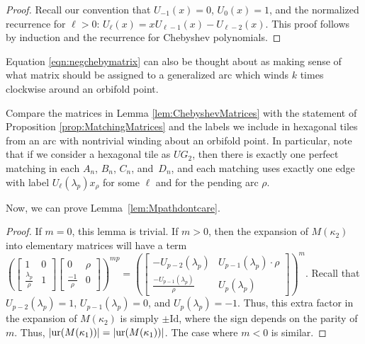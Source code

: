 \documentclass[pdftex]{sigma}%
\numberwithin{equation}{section}
\begin{document}
\begin{proof}Recall our convention that $U_{-1}(x) = 0$, $U_0(x) = 1$, and the normalized recurrence for $\ell > 0$: $U_\ell(x) = x U_{\ell-1}(x) - U_{\ell-2}(x)$. This proof follows by induction and the recurrence for Chebyshev polynomials.
\end{proof}

\begin{Remark}Equation \ref{eqn:negchebymatrix} can also be thought about as making sense of what matrix should be assigned to a generalized arc which winds $k$ times clockwise around an orbifold point.
\end{Remark}

\begin{Remark}Compare the matrices in Lemma \ref{lem:ChebyshevMatrices} with the statement of Proposition \ref{prop:MatchingMatrices} and the labels we include in hexagonal tiles from an arc with nontrivial winding about an orbifold point. In particular, note that if we consider a hexagonal tile as $UG_2$, then there is exactly one perfect matching in each $A_n$, $B_n$, $C_n$, and~$D_n$, and each matching uses exactly one edge with label $U_\ell(\lambda_p)x_\rho$ for some $\ell$ and for the pending arc $\rho$.
\end{Remark}

Now, we can prove Lemma~\ref{lem:Mpathdontcare}.

\begin{proof}If $m = 0$, this lemma is trivial. If $m > 0$, then the expansion of $M(\kappa_2)$ into elementary matrices will have a term $\left( \left[\begin{smallmatrix} 1 & 0 \\ \frac{\lambda_p}{\rho} & 1 \end{smallmatrix}\right] \left[\begin{smallmatrix} 0 & \rho \\ \frac{-1}{\rho} & 0 \end{smallmatrix}\right] \right)^{mp} = \left(\left[\begin{smallmatrix} -U_{p-2} (\lambda_p) & U_{p-1}(\lambda_p) \cdot \rho \\ \frac{-U_{p-1}(\lambda_p)}{\rho} & U_p(\lambda_p) \end{smallmatrix}\right]\right)^m $. Recall that $U_{p-2}(\lambda_p) = 1$, $U_{p-1}(\lambda_p) = 0$, and $U_p(\lambda_p) = -1$. Thus, this extra factor in the expansion of $M(\kappa_2)$ is simply $\pm \text{Id}$, where the sign depends on the parity of $m$. Thus, $\vert {\rm ur}(M(\kappa_1)) \vert = \vert {\rm ur}(M(\kappa_1)) \vert$. The case where $m < 0$ is similar.
\end{proof}
\end{document}
